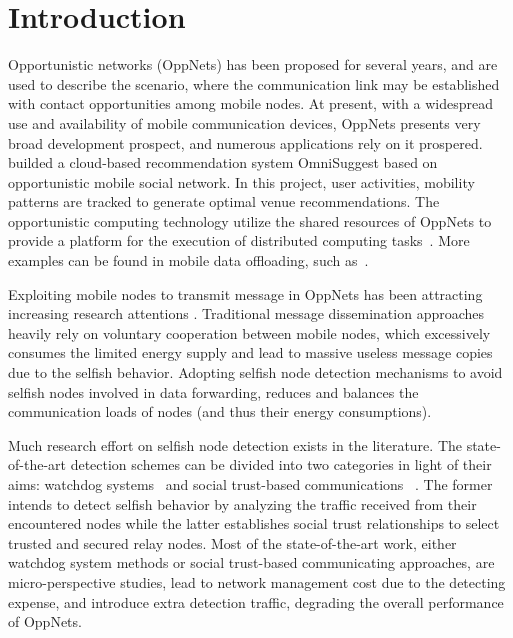 \section{Introduction}
\label{sec:intro}
Opportunistic networks (OppNets)
has been proposed for several years,
and are used to describe the scenario,
where the communication link may be
established with contact opportunities
among mobile nodes.
At present, with a widespread use and
availability of mobile communication devices,
OppNets presents very broad development prospect,
and numerous applications rely on it prospered.
\cite{DBLP:journals/tsc/KhalidKKZ14} builded a
cloud-based recommendation system OmniSuggest
based on opportunistic mobile social network.
In this project, user activities,
mobility patterns are tracked to
generate optimal venue recommendations.
The opportunistic computing technology utilize
the shared resources of OppNets to
provide a platform for the execution
of distributed computing tasks~\cite{DBLP:journals/tmc/ChatzopoulosAKH18}.
More examples can be found in mobile data offloading,
such as~\cite{DBLP:journals/tmc/HanHKMSS12,
DBLP:journals/tmc/LiQJHW014}.

Exploiting mobile nodes to transmit message in
OppNets has been attracting
increasing research attentions
\cite{DBLP:conf/sigcomm/SouzaMSMCC16,
DBLP:conf/mobicom/RadenkovicH17,
DBLP:journals/comsur/JedariXN18,
DBLP:journals/tmc/LoretiB20}.
Traditional message dissemination approaches
heavily rely on voluntary cooperation between
mobile nodes, which excessively consumes the
limited energy supply and lead to massive useless
message copies due to the selfish behavior.
Adopting selfish node detection mechanisms
to avoid selfish nodes involved in data forwarding,
reduces and balances the communication loads
of nodes (and thus their energy consumptions).


Much research effort on selfish node detection
exists in the literature. The state-of-the-art
detection schemes can be divided into two categories
in light of their aims:
watchdog systems~\cite{DBLP:conf/mobicom/MartiGLB00,
DBLP:journals/tmc/Hernandez-Orallo15,
DBLP:journals/tie/DiasRXM15,
DBLP:journals/fgcs/JedariXCDTA19}
and social trust-based communications
~\cite{DBLP:journals/tpds/ZhuDGDC14,
DBLP:journals/tdsc/ChoC18,
DBLP:journals/tmc/ChoiSLW12}.
The former intends to detect selfish behavior
by analyzing the traffic received
from their encountered nodes
while the latter establishes social trust relationships
to select trusted and secured relay nodes.
Most of the state-of-the-art work,
either watchdog system methods
or social trust-based communicating approaches,
are micro-perspective studies,
lead to network management cost
due to the detecting expense,
and introduce extra detection traffic,
degrading the overall performance of OppNets.

